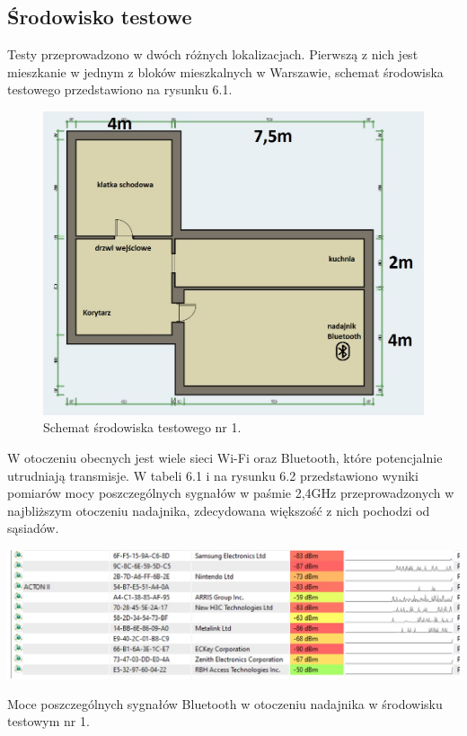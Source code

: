 \documentclass[12pt, twoside, openany]{mwrep}
\begin{document}
\subsection{Środowisko testowe}
Testy przeprowadzono w dwóch różnych lokalizacjach. Pierwszą z nich jest mieszkanie w jednym z bloków mieszkalnych w Warszawie, schemat środowiska testowego przedstawiono na rysunku 6.1.
\begin{figure}[H]
\centering
\includegraphics[scale=0.6]{mieszkanke}
\caption{Schemat środowiska testowego nr 1.}
\end{figure}
W otoczeniu obecnych jest wiele sieci Wi-Fi oraz Bluetooth, które potencjalnie utrudniają transmisje. W tabeli 6.1 i na rysunku 6.2 przedstawiono wyniki pomiarów mocy poszczególnych sygnałów w paśmie 2,4GHz przeprowadzonych w najbliższym otoczeniu nadajnika, zdecydowana większość z nich pochodzi od sąsiadów.
\begin{table}[H]
\centering
\includegraphics[scale=0.4]{bt}
\caption{Moce poszczególnych sygnałów Bluetooth w otoczeniu nadajnika w środowisku testowym nr 1.}
\end{table}
\end{document}
